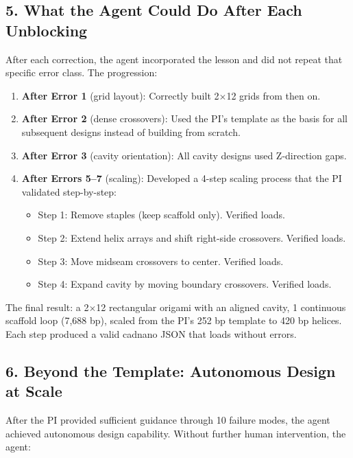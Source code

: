 \documentclass[
  11pt,
]{article}
\providecommand{\tightlist}{%
  \setlength{\itemsep}{0pt}\setlength{\parskip}{0pt}}
\begin{document}
\subsection{5. What the Agent Could Do After Each
Unblocking}\label{what-the-agent-could-do-after-each-unblocking}

After each correction, the agent incorporated the lesson and did not
repeat that specific error class. The progression:

\begin{enumerate}
\def\labelenumi{\arabic{enumi}.}
\tightlist
\item
  \textbf{After Error 1} (grid layout): Correctly built 2$\times$12 grids from
  then on.
\item
  \textbf{After Error 2} (dense crossovers): Used the PI's template as
  the basis for all subsequent designs instead of building from scratch.
\item
  \textbf{After Error 3} (cavity orientation): All cavity designs used
  Z-direction gaps.
\item
  \textbf{After Errors 5--7} (scaling): Developed a 4-step scaling
  process that the PI validated step-by-step:

  \begin{itemize}
  \tightlist
  \item
    Step 1: Remove staples (keep scaffold only). Verified loads.
  \item
    Step 2: Extend helix arrays and shift right-side crossovers.
    Verified loads.
  \item
    Step 3: Move midseam crossovers to center. Verified loads.
  \item
    Step 4: Expand cavity by moving boundary crossovers. Verified loads.
  \end{itemize}
\end{enumerate}

The final result: a 2$\times$12 rectangular origami with an aligned cavity, 1
continuous scaffold loop (7,688 bp), scaled from the PI's 252 bp
template to 420 bp helices. Each step produced a valid cadnano JSON that
loads without errors.

\subsection{6. Beyond the Template: Autonomous Design at
Scale}\label{beyond-the-template-autonomous-design-at-scale}

After the PI provided sufficient guidance through 10 failure modes, the
agent achieved autonomous design capability. Without further human
intervention, the agent:
\end{document}
